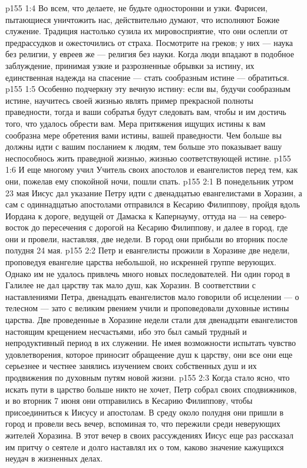 \vs p155 1:4 Во всем, что делаете, не будьте односторонни и узки. Фарисеи, пытающиеся уничтожить нас, действительно думают, что исполняют Божие служение. Традиция настолько сузила их мировосприятие, что они ослепли от предрассудков и ожесточились от страха. Посмотрите на греков; у них --- наука без религии, у евреев же --- религия без науки. Когда люди впадают в подобное заблуждение, принимая узкие и разрозненные обрывки за истину, их единственная надежда на спасение --- стать сообразным истине --- обратиться.
\vs p155 1:5 Особенно подчеркну эту вечную истину: если вы, будучи сообразным истине, научитесь своей жизнью являть пример прекрасной полноты праведности, тогда и ваши собратья будут следовать вам, чтобы и им достичь того, что удалось обрести вам. Мера притяжения ищущих истины к вам сообразна мере обретения вами истины, вашей праведности. Чем больше вы должны идти с вашим посланием к людям, тем больше это показывает вашу неспособнось жить праведной жизнью, жизнью соответствующей истине.
\vs p155 1:6 И еще многому учил Учитель своих апостолов и евангелистов перед тем, как они, пожелав ему спокойной ночи, пошли спать.
\vs p155 2:1 В понедельник утром 23 мая Иисус дал указание Петру идти с двенадцатью евангелистами в Хоразин, а сам с одиннадцатью апостолами отправился в Кесарию Филиппову, пройдя вдоль Иордана к дороге, ведущей от Дамаска к Капернауму, оттуда на --- на северо\hyp{}восток до пересечения с дорогой на Кесарию Филиппову, и далее в город, где они и провели, наставляя, две недели. В город они прибыли во вторник после полудня 24 мая.
\vs p155 2:2 Петр и евангелисты прожили в Хоразине две недели, проповедуя евангелие царства небольшой, но искренней группе верующих. Однако им не удалось привлечь много новых последователей. Ни один город в Галилее не дал царству так мало душ, как Хоразин. В соответствии с наставлениями Петра, двенадцать евангелистов мало говорили об исцелении --- о телесном --- зато с великим рвением учили и проповедовали духовные истины царства. Две проведенные в Хоразине недели стали для двенадцати евангелистов настоящим крещением несчастьями, ибо это был самый трудный и непродуктивный период в их служении. Не имея возможности испытать чувство удовлетворения, которое приносит обращеение душ к царству, они все они еще серьезнее и честнее занялись изучением своих собственных душ и их продвижения по духовным путям новой жизни.
\vs p155 2:3 Когда стало ясно, что искать пути в царство больше никто не хочет, Петр собрал своих сподвижников, и во вторник 7 июня они отправились в Кесарию Филиппову, чтобы присоединиться к Иисусу и апостолам. В среду около полудня они пришли в город и провели весь вечер, вспоминая то, что пережили среди неверующих жителей Хоразина. В этот вечер в своих рассуждениях Иисус еще раз рассказал им притчу о сеятеле и долго наставлял их о том, каково значение кажущихся неудач в жизненных делах.
